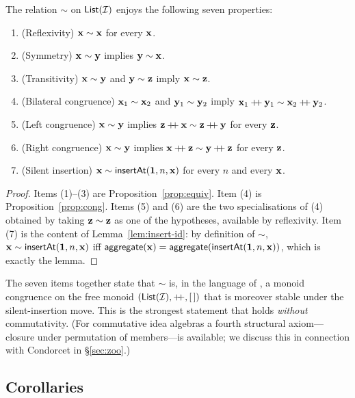 \begin{theorem}\label{thm:congr}
The relation $\sim$ on $\mathsf{List}(\mathcal{I})$ enjoys the following seven
properties:
\begin{enumerate}
\item (Reflexivity) $\mathbf{x} \sim \mathbf{x}$ for every $\mathbf{x}$.
\item (Symmetry) $\mathbf{x} \sim \mathbf{y}$ implies $\mathbf{y} \sim \mathbf{x}$.
\item (Transitivity) $\mathbf{x} \sim \mathbf{y}$ and $\mathbf{y} \sim \mathbf{z}$ imply $\mathbf{x} \sim \mathbf{z}$.
\item (Bilateral congruence) $\mathbf{x}_1 \sim \mathbf{x}_2$ and $\mathbf{y}_1 \sim
  \mathbf{y}_2$ imply $\mathbf{x}_1 \mathbin{+\!\!+} \mathbf{y}_1 \sim \mathbf{x}_2 \mathbin{+\!\!+} \mathbf{y}_2$.
\item (Left congruence) $\mathbf{x} \sim \mathbf{y}$ implies $\mathbf{z} \mathbin{+\!\!+} \mathbf{x} \sim
  \mathbf{z} \mathbin{+\!\!+} \mathbf{y}$ for every $\mathbf{z}$.
\item (Right congruence) $\mathbf{x} \sim \mathbf{y}$ implies $\mathbf{x} \mathbin{+\!\!+} \mathbf{z} \sim
  \mathbf{y} \mathbin{+\!\!+} \mathbf{z}$ for every $\mathbf{z}$.
\item (Silent insertion) $\mathbf{x} \sim \mathsf{insertAt}(\mathbf{1}, n, \mathbf{x})$ for every
  $n$ and every $\mathbf{x}$.
\end{enumerate}
\end{theorem}

\begin{proof}
Items (1)--(3) are Proposition~\ref{prop:equiv}.
Item (4) is Proposition~\ref{prop:cong}. Items (5) and (6) are the
two specialisations of (4) obtained by taking $\mathbf{z} \sim \mathbf{z}$ as one
of the hypotheses, available by reflexivity. Item (7) is the
content of Lemma~\ref{lem:insert-id}: by definition of $\sim$,
$\mathbf{x} \sim \mathsf{insertAt}(\mathbf{1}, n, \mathbf{x})$ iff $\mathsf{aggregate}(\mathbf{x}) =
\mathsf{aggregate}(\mathsf{insertAt}(\mathbf{1}, n, \mathbf{x}))$, which is exactly the lemma.
\end{proof}

The seven items together state that $\sim$ is, in the language of
\cite{Howie1995}, a monoid congruence on the free monoid
$(\mathsf{List}(\mathcal{I}), \mathbin{+\!\!+}, [\,])$ that is moreover stable under the
silent-insertion move. This is the strongest statement that holds
\emph{without} commutativity. (For commutative idea algebras a
fourth structural axiom---closure under permutation of members---is
available; we discuss this in connection with Condorcet in
\S\ref{sec:zoo}.)

\subsection*{Corollaries}

